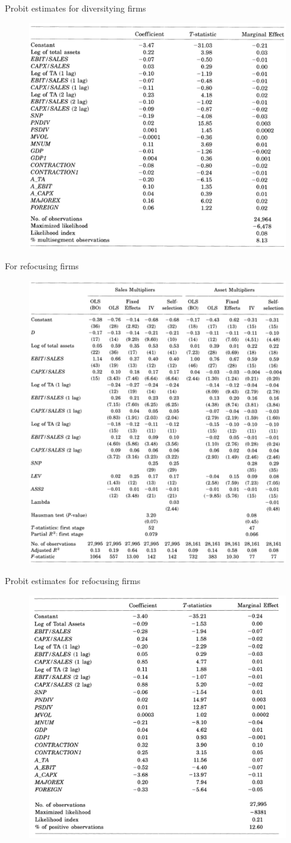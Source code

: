 \documentclass[aspectratio=169,xcolor=dvipsnames]{beamer}
\begin{document}
\begin{frame}{Probit estimates for diversitying firms}
    \begin{figure}
        \includegraphics[width=0.6\linewidth]{figures/table8.png}
        \caption{}
    \end{figure}
\end{frame}

\begin{frame}{For refocusing firms}
    \begin{figure}
        \includegraphics[width=0.5\linewidth]{figures/table9.png}
        \caption{}
    \end{figure}
\end{frame}

\begin{frame}{Probit estimates for refocusing firms}
    \begin{figure}
        \includegraphics[width=0.6\linewidth]{figures/table10.png}
        \caption{}
    \end{figure}
\end{frame}
\end{document}
